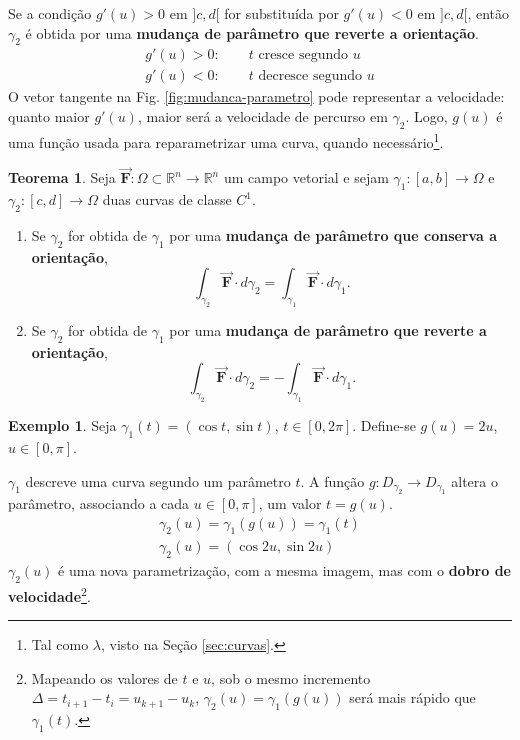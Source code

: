 \documentclass[11pt]{article}
\theoremstyle{definition}
\newtheorem{teorema}{Teorema}
\newtheorem{exemplo}{Exemplo}
\begin{document}
	Se a condição $g'(u)>0$ em $]c,d[$ for substituída por $g'(u)<0$ em $]c,d[$, então $\gamma_2$ é obtida por uma \textbf{mudança de parâmetro que reverte a orientação}.
	\begin{gather*}
		g'(u)>0:\qquad \text{$t$ cresce segundo $u$} \\
		g'(u)<0:\qquad \text{$t$ decresce segundo $u$}
	\end{gather*}
	O vetor tangente na Fig. \ref{fig:mudanca-parametro} pode representar a velocidade: quanto maior $g'(u)$, maior será a velocidade de percurso em $\gamma_2$. Logo, $g(u)$ é uma função usada para reparametrizar uma curva, quando necessário\footnote{Tal como $\lambda$, visto na Seção \ref{sec:curvas}.}.
	\begin{teorema}
		Seja $\boldsymbol{\vec{F}}:\Omega \subset \mathbb{R}^n\to \mathbb{R}^n$ um campo vetorial e sejam $\gamma_1:[a,b]\to \Omega$ e $\gamma_2:[c,d]\to \Omega$ duas curvas de classe $C^1$.
	\end{teorema}
	\begin{enumerate}
		\item Se $\gamma_2$ for obtida de $\gamma_1$ por uma \textbf{mudança de parâmetro que conserva a orientação},
		\begin{equation*}
			\int_{\gamma_2} \boldsymbol{\vec{F}}\cdot d\gamma_2=\int_{\gamma_1} \boldsymbol{\vec{F}}\cdot d\gamma_1.
		\end{equation*}
	
		\item Se $\gamma_2$ for obtida de $\gamma_1$ por uma \textbf{mudança de parâmetro que reverte a orientação},
		\begin{equation*}
			\int_{\gamma_2} \boldsymbol{\vec{F}}\cdot d\gamma_2=-\int_{\gamma_1} \boldsymbol{\vec{F}}\cdot d\gamma_1.
		\end{equation*}
	\end{enumerate}

	\begin{exemplo}
		Seja $\gamma_1(t)=(\cos t, \sin t)$, $t\in [0,2\pi]$. Define-se $g(u)=2u$, $u\in [0,\pi]$.
	\end{exemplo}
	$\gamma_1$ descreve uma curva segundo um parâmetro $t$. A função $g:D_{\gamma_2}\to D_{\gamma_1}$ altera o parâmetro, associando a cada $u \in [0,\pi]$, um valor $t=g(u)$.
	\begin{gather*}
		\gamma_2(u)=\gamma_1(g(u))=\gamma_1(t) \\
		\gamma_2(u)=(\cos 2u, \sin 2u)
	\end{gather*}
	$\gamma_2(u)$ é uma nova parametrização, com a mesma imagem, mas com o \textbf{dobro de velocidade}\footnote{Mapeando os valores de $t$ e $u$, sob o mesmo incremento $\Delta=t_{i+1}-t_{i}=u_{k+1}-u_{k}$, $\gamma_2(u)=\gamma_1(g(u))$ será mais rápido que $\gamma_1(t)$.}.
	
\end{document}
